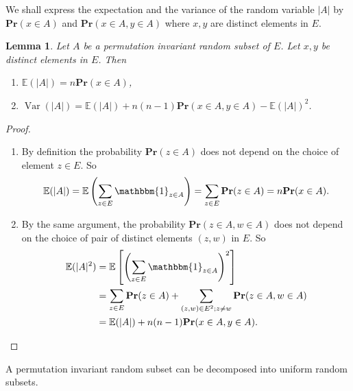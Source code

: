 \documentclass{article}
\DeclareMathOperator{\Var}{Var}
\def\Pr{\mathbf{Pr}}
\newtheorem{lem}[thm]{Lemma}
\theoremstyle{remark}
\begin{document}
We shall express the expectation and the variance of the random variable $|A|$ by $\Pr(x\in A)$ and $\Pr(x\in A,y\in A)$ where $x,y$ are distinct elements in $E$.
\begin{lem} \label{E and Var} Let $A$ be a permutation invariant random subset of $E$. Let $x,y$ be distinct elements in $E$. Then
\begin{enumerate}[$(i)$]
    \item $\mathbb{E}(|A|) =n \Pr(x\in A)$,
    \item $\Var(|A|) = \mathbb{E}(|A|) +n(n-1)\Pr(x\in A,y\in A)-\mathbb{E}(|A|)^2$.
\end{enumerate}
\end{lem}
\begin{proof}\quad
\begin{enumerate}[$(i)$]
    \item By definition the probability $\Pr(z\in A)$ does not depend on the choice of element $z\in E$. So \[\mathbb{E}(|A|) = \mathbb{E}\left(\sum_{z\in E}\mathbbm{1}_{z\in A}\right) = \sum_{z\in E}\Pr(z\in A) = n \Pr(x\in A).\]
    \item By the same argument, the probability $\Pr(z\in A, w\in A)$ does not depend on the choice of pair of distinct elements $(z,w)$ in $E$. So
    \[\begin{split}\mathbb{E}(|A|^2) & = \mathbb{E}\left[\left(\sum_{z\in E}\mathbbm{1}_{z\in A}\right)^2\right]\\
    & = \sum_{z\in E}\Pr(z\in A) + \sum_{(z,w)\in E^2;z\neq w} \Pr(z\in A, w\in A)\\
    & = \mathbb{E}(|A|) +n(n-1)\Pr(x\in A,y\in A). \end{split}\]
\end{enumerate}
\end{proof}

A permutation invariant random subset can be decomposed into uniform random subsets.
\end{document}
